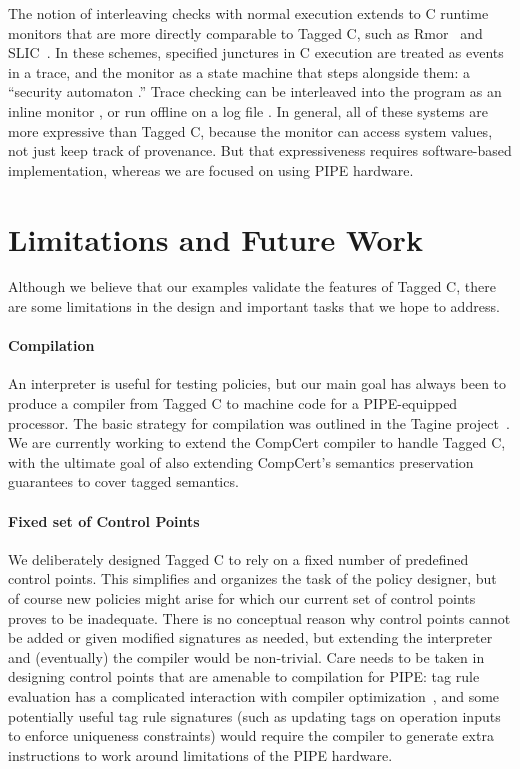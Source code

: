 \documentclass{llncs}
\begin{document}
The notion of interleaving checks with normal execution extends to
C runtime monitors that are more directly comparable to Tagged C, such as
{\sc Rmor}~\cite{Havelund08:RVC} and SLIC~\cite{Ball02:slic}.
In these schemes, specified junctures in C execution are treated as events in a trace,
and the monitor as a state machine that steps alongside them: a ``security automaton
\cite{Schneider00:Automata}.''
Trace checking can be interleaved into the program as
an inline monitor \cite{Lundblad13:IRM}, or run offline on a log file \cite{Havelund22:LogScope}.
In general, all of these systems are more expressive than Tagged C, because the
monitor can access system values, not just keep track of provenance. But that expressiveness
requires software-based implementation, whereas we are focused on using PIPE hardware.

\section{Limitations and Future Work}
\label{sec:limitations}
\label{sec:futurework}

Although we believe that our examples validate the features of Tagged C, 
there are some limitations in the design and important tasks that we
hope to address.

\paragraph*{Compilation}
An interpreter is useful for testing policies, but our main goal has always been to
produce a compiler from Tagged C to machine code for a PIPE-equipped processor.
The basic strategy for compilation was outlined in the Tagine project~\cite{Chhak21:Tagine}.
We are currently working to extend the CompCert compiler to handle Tagged C, with the ultimate
goal of also extending CompCert's semantics preservation guarantees to cover tagged semantics.

\paragraph*{Fixed set of Control Points}
We deliberately designed Tagged C to rely on a fixed number of predefined
control points. This simplifies and organizes the task of the policy designer, but of course
new policies might arise for which our current set of
control points proves to be inadequate.  There is no conceptual reason why
control points cannot be added or given modified signatures as needed,
but extending the interpreter and (eventually) the compiler would be non-trivial.
Care needs to be taken in designing control points that are amenable
to compilation for PIPE: tag rule evaluation has a complicated interaction with
compiler optimization~\cite{Chhak21:Tagine}, and some potentially useful tag
rule signatures (such as updating tags on operation inputs to enforce uniqueness
constraints) would require the compiler to generate extra instructions to work
around limitations of the PIPE hardware.
\end{document}
